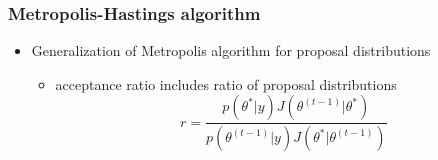 \documentclass[10pt]{beamer}
\begin{document}
\begin{frame}

\end{frame}

\begin{frame}

\frametitle{Metropolis-Hastings algorithm}

  \begin{itemize}
  \item Generalization of Metropolis algorithm for  proposal distributions
    \begin{itemize}
    \item acceptance ratio includes ratio of proposal distributions
      \begin{equation*}
        r =
        \frac{p(\theta^{*}|y)J(\theta^{(t-1)}|\theta^{*})}
        {p(\theta^{(t-1)}|y)J(\theta^{*}|\theta^{(t-1)})}
      \end{equation*}
    \end{itemize}
  \end{itemize}

\end{frame}
\end{document}
